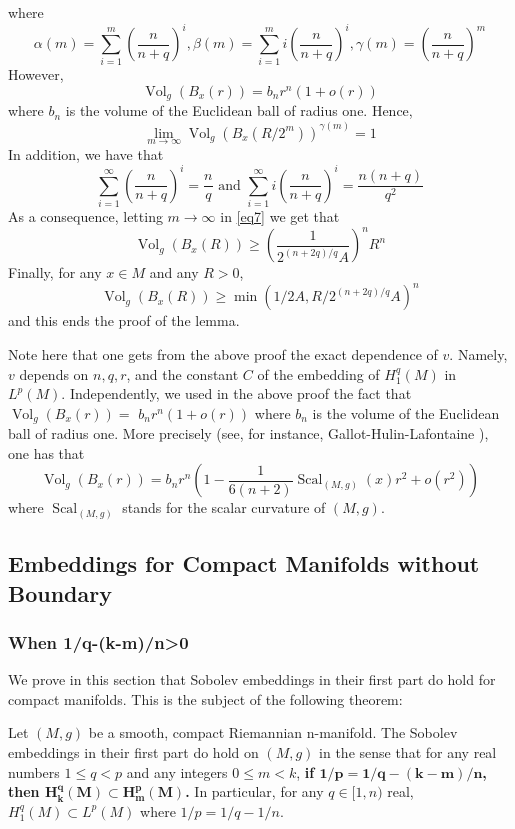 \documentclass[12pt,hyperref,a4paper,UTF8]{ctexart}
\begin{document}
\begin{Proof}
\begin{equation}
\label{eq7}
\end{equation}
where
$$
\alpha(m)=\sum_{i=1}^m\left(\frac{n}{n+q}\right)^i, \beta(m)=\sum_{i=1}^m i\left(\frac{n}{n+q}\right)^i,  \gamma(m)=\left(\frac{n}{n+q}\right)^m
$$
However,
$$
\operatorname{Vol}_g\left(B_x(r)\right)=b_n r^n(1+o(r))
$$
where $b_n$ is the volume of the Euclidean ball of radius one. Hence,
$$
\lim _{m \rightarrow \infty} \operatorname{Vol}_g\left(B_x\left(R / 2^{m}\right)\right)^{\gamma(m)}=1
$$
In addition, we have that
$$
\sum_{i=1}^{\infty}\left(\frac{n}{n+q}\right)^i=\frac{n}{q} \text { and } \sum_{i=1}^{\infty} i\left(\frac{n}{n+q}\right)^i=\frac{n(n+q)}{q^2}
$$
As a consequence, letting $m \rightarrow \infty$ in \autoref{eq7} we get that
$$
\operatorname{Vol}_g\left(B_x(R)\right) \geq\left(\frac{1}{2^{(n+2 q) / q} A}\right)^n R^n
$$
Finally, for any $x \in M$ and any $R>0$,
$$
\operatorname{Vol}_g\left(B_x(R)\right) \geq \min \left(1 / 2 A, R / 2^{(n+2 q) / q} A\right)^n
$$
and this ends the proof of the lemma.
\end{Proof}

\vskip 3pt
Note here that one gets from the above proof the exact dependence of $v$. Namely, $v$ depends on $n, q, r$, and the constant $C$ of the embedding of $H_1^q(M)$ in $L^p(M)$. Independently, we used in the above proof the fact that $\operatorname{Vol}_g\left(B_x(r)\right)=$ $b_n r^n(1+o(r))$ where $b_n$ is the volume of the Euclidean ball of radius one. More precisely (see, for instance, Gallot-Hulin-Lafontaine \cite{Gallot}), one has that
$$
\operatorname{Vol}_g\left(B_x(r)\right)=b_n r^n\left(1-\frac{1}{6(n+2)} \operatorname{Scal}_{(M, g)}(x) r^2+o\left(r^2\right)\right)
$$
where $\operatorname{Scal}_{(M, g)}$ stands for the scalar curvature of $(M, g)$.

\subsection{Embeddings for Compact Manifolds without Boundary}

\subsubsection{When 1/q-(k-m)/n>0}
We prove in this section that Sobolev embeddings in their first part do hold for compact manifolds. This is the subject of the following theorem:
\begin{Theorem}
    Let $(M, g)$ be a smooth, compact Riemannian n-manifold. The Sobolev embeddings in their first part do hold on $(M, g)$ in the sense that for any real numbers $1 \leq q<p$ and any integers $0 \leq m<k$, \textbf{if $\bm{1 / p=1 / q-(k-m) / n}$, then $\bm{H_k^q(M) \subset H_m^p(M)}$.} In particular, for any $q \in[1, n)$ real, $H_1^q(M) \subset L^p(M)$ where $1 / p=1 / q-1 / n$.
\label{thm35}
\end{Theorem}
\end{document}
